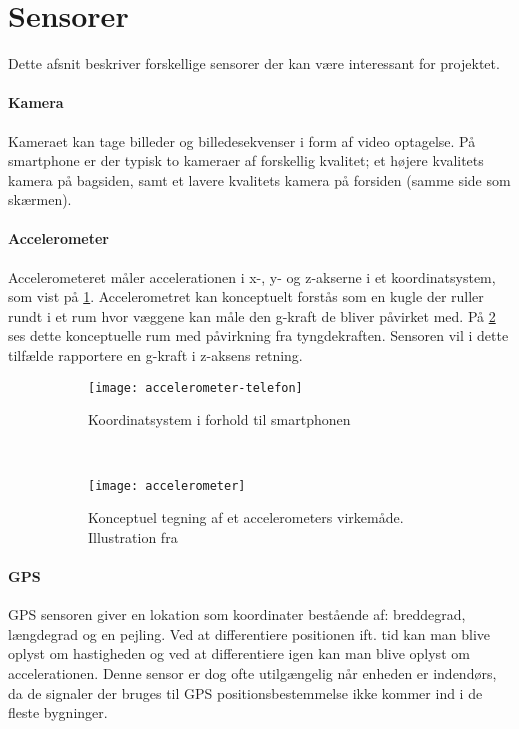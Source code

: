 \section{Sensorer}\label{sensorer}
Dette afsnit beskriver forskellige sensorer der kan være interessant for projektet. 

\paragraph{Kamera}
Kameraet kan tage billeder og billedesekvenser i form af video optagelse.
På smartphone er der typisk to kameraer af forskellig kvalitet; et højere kvalitets kamera på bagsiden, samt et lavere kvalitets kamera på forsiden (samme side som skærmen).

\paragraph{Accelerometer}
Accelerometeret måler accelerationen i x-, y- og z-akserne i et koordinatsystem, som vist på \cref{analyse:accelerometer:koo}.
Accelerometret kan konceptuelt forstås som en kugle der ruller rundt i et rum hvor væggene kan måle den g-kraft de bliver påvirket med.
På \cref{analyse:accelerometer:kraft} ses dette konceptuelle rum med påvirkning fra tyngdekraften. 
Sensoren vil i dette tilfælde rapportere en g-kraft i z-aksens retning.

\begin{figure}[h]
	\centering
	\begin{subfigure}[b]{0.47\textwidth}
		\centering
		\texttt{[image: accelerometer-telefon]}
		\caption{Koordinatsystem i forhold til smartphonen}
		\label{analyse:accelerometer:koo}
	\end{subfigure}
	~
	\begin{subfigure}[b]{0.47\textwidth}
		\centering
		\texttt{[image: accelerometer]}
		\caption{Konceptuel tegning af et accelerometers virkemåde. Illustration fra \citep{accelerometer}}
		\label{analyse:accelerometer:kraft}
	\end{subfigure}
	\caption{}
	\label{accelerometer}
\end{figure} 

\paragraph{GPS}
GPS sensoren giver en lokation som koordinater bestående af: breddegrad, længdegrad og en pejling.
Ved at differentiere positionen ift. tid kan man blive oplyst om hastigheden og ved at differentiere igen kan man blive oplyst om accelerationen.
Denne sensor er dog ofte utilgængelig når enheden er indendørs, da de signaler der bruges til GPS positionsbestemmelse ikke kommer ind i de fleste bygninger.

